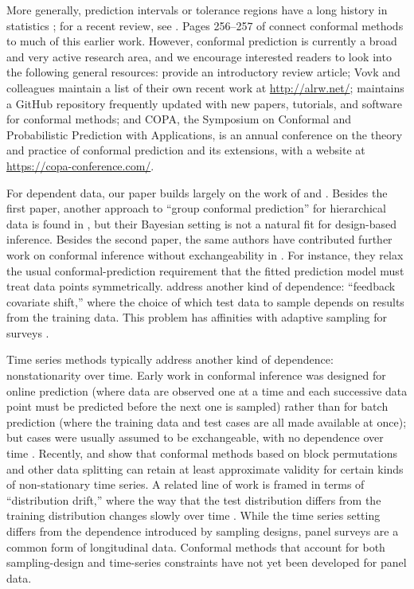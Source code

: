 \documentclass[10.5pt, letterpaper]{article}
\numberwithin{table}{section}
\numberwithin{figure}{section}
\numberwithin{equation}{section}
\begin{document}
More generally, prediction intervals or tolerance regions have a long history in statistics \citep{fraser1967nonparametric, guttman1970statistical}; for a recent review, see \cite{tian2022methods}. Pages 256--257 of \cite{vovk2005algorithmic} connect conformal methods to much of this earlier work. However, conformal prediction is currently a broad and very active research area, and we encourage interested readers to look into the following general resources: \cite{angelopoulos2022gentle} provide an introductory review article; Vovk and colleagues maintain a list of their own recent work at \url{http://alrw.net/}; \cite{manokhin2022awesome} maintains a GitHub repository frequently updated with new papers, tutorials, and software for conformal methods; and COPA, the Symposium on Conformal and Probabilistic Prediction with Applications, is an annual conference on the theory and practice of conformal prediction and its extensions, with a website at \url{https://copa-conference.com/}.



For dependent data, our paper builds largely on the work of \cite{dunn2022distribution} and \cite{tibshirani2019conformal}.
Besides the first paper, another approach to ``group conformal prediction'' for hierarchical data is found in \cite{fong2021conformal}, but their Bayesian setting is not a natural fit for design-based inference.
Besides the second paper, the same authors have contributed further work on conformal inference without exchangeability in \cite{barber2022conformal}. For instance, they relax the usual conformal-prediction requirement that the fitted prediction model must treat data points symmetrically. \cite{fannjiang2022conformal} address another kind of dependence: ``feedback covariate shift,'' where the choice of which test data to sample depends on results from the training data. This problem has affinities with adaptive sampling for surveys \citep{thompson1997adaptive}.


Time series methods typically address another kind of dependence: nonstationarity over time. Early work in conformal inference was designed for online prediction (where data are observed one at a time and each successive data point must be predicted before the next one is sampled) rather than for batch prediction (where the training data and test cases are all made available at once); but cases were usually assumed to be exchangeable, with no dependence over time \citep{vovk2005algorithmic}.
Recently, \cite{chernozhukov2018exact} and \cite{oliveira2022split} show that conformal methods based on block permutations and other data splitting can retain at least approximate validity for certain kinds of non-stationary time series. A related line of work is framed in terms of ``distribution drift,'' where the way that the test distribution differs from the training distribution changes slowly over time \citep{gibbs2021adaptive}.
While the time series setting differs from the dependence introduced by sampling designs, panel surveys are a common form of longitudinal data. Conformal methods that account for both sampling-design and time-series constraints have not yet been developed for panel data.
\end{document}

